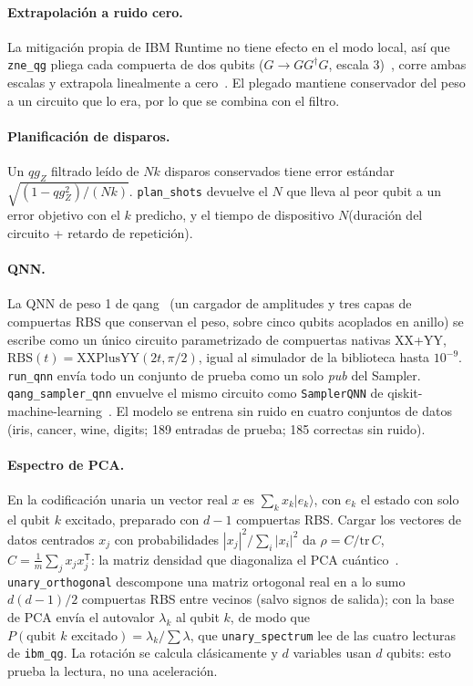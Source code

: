 \documentclass[11pt]{article}
\newcommand{\qZ}{qg_Z}
\begin{document}
\paragraph{Extrapolación a ruido cero.} La mitigación propia de IBM Runtime no tiene efecto en el modo
local, así que \texttt{zne\_qg} pliega cada compuerta de dos qubits ($G\to GG^\dagger G$, escala
3)~\cite{giurgicatiron2020}, corre ambas escalas y extrapola linealmente a cero~\cite{temme2017}. El plegado
mantiene conservador del peso a un circuito que lo era, por lo que se combina con el filtro.

\paragraph{Planificación de disparos.} Un $\qZ$ filtrado leído de $Nk$ disparos conservados tiene error
estándar $\sqrt{(1-\qZ^2)/(Nk)}$. \texttt{plan\_shots} devuelve el $N$ que lleva al peor qubit a un error
objetivo con el $k$ predicho, y el tiempo de dispositivo $N$(duración del circuito + retardo de repetición).

\paragraph{QNN.} La QNN de peso 1 de qang~\cite{monteverde2026qml} (un cargador de amplitudes y tres capas
de compuertas RBS que conservan el peso, sobre cinco qubits acoplados en anillo) se escribe como un único
circuito parametrizado de compuertas nativas XX+YY, $\mathrm{RBS}(t)=\mathrm{XXPlusYY}(2t,\pi/2)$, igual al
simulador de la biblioteca hasta $10^{-9}$. \texttt{run\_qnn} envía todo un conjunto de prueba como un solo
\emph{pub} del Sampler. \texttt{qang\_sampler\_qnn} envuelve el mismo circuito como \texttt{SamplerQNN} de
qiskit-machine-learning~\cite{qiskitml}. El modelo se entrena sin ruido en cuatro conjuntos de datos (iris,
cancer, wine, digits; 189 entradas de prueba; 185 correctas sin ruido).

\paragraph{Espectro de PCA.} En la codificación unaria un vector real $x$ es $\sum_k x_k|e_k\rangle$, con
$e_k$ el estado con solo el qubit $k$ excitado, preparado con $d-1$ compuertas RBS. Cargar los vectores de
datos centrados $x_j$ con probabilidades $|x_j|^2/\sum_i|x_i|^2$ da $\rho=C/\mathrm{tr}\,C$,
$C=\frac1m\sum_j x_jx_j^{\mathsf T}$: la matriz densidad que diagonaliza el PCA cuántico~\cite{lloyd2014qpca}.
\texttt{unary\_orthogonal} descompone una matriz ortogonal real en a lo sumo $d(d-1)/2$ compuertas RBS entre
vecinos (salvo signos de salida); con la base de PCA envía el autovalor $\lambda_k$ al qubit $k$, de modo que
$P(\text{qubit }k\text{ excitado})=\lambda_k/\sum\lambda$, que \texttt{unary\_spectrum} lee de las cuatro
lecturas de \texttt{ibm\_qg}. La rotación se calcula clásicamente y $d$ variables usan $d$ qubits: esto
prueba la lectura, no una aceleración.
\end{document}
